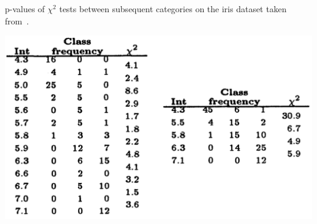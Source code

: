 %

\begin{table}
\caption{\label{tab:chimerge_ex} p-values of $\chi^2$ tests between subsequent categories on the iris dataset taken from~\cite{kerber1992chimerge}.}
\centering
\includegraphics[width = .7\textwidth]{figures/appendix/tab_chimerge.PNG}
\end{table}

